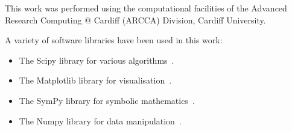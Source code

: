 \documentclass[10pt]{article}
\begin{document}
This work was performed using the computational facilities of the Advanced
Research Computing @ Cardiff (ARCCA) Division, Cardiff University.

A variety of software libraries have been used in this work:

\begin{itemize}
    \item The Scipy library for various algorithms~\cite{scipy}.
    \item The Matplotlib library for visualisation~\cite{hunter2007matplotlib}.
    \item The SymPy library for symbolic mathematics~\cite{sympy}.
    \item The Numpy library for data manipulation~\cite{walt2011numpy}.
\end{itemize}




\end{document}
